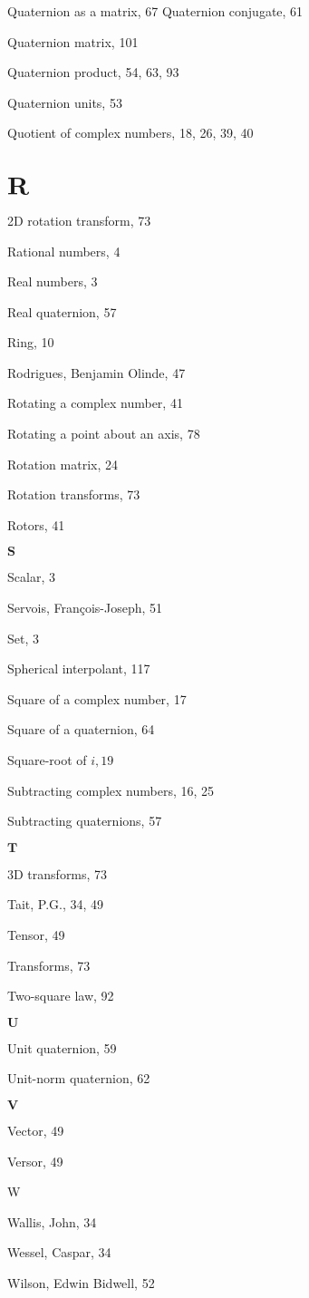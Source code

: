 Quaternion as a matrix, 67 Quaternion conjugate, 61

Quaternion matrix, 101

Quaternion product, 54, 63, 93

Quaternion units, 53

Quotient of complex numbers, 18, 26, 39, 40

\section{$\mathbf{R}$}
2D rotation transform, 73

Rational numbers, 4

Real numbers, 3

Real quaternion, 57

Ring, 10

Rodrigues, Benjamin Olinde, 47

Rotating a complex number, 41

Rotating a point about an axis, 78

Rotation matrix, 24

Rotation transforms, 73

Rotors, 41

$\mathbf{S}$

Scalar, 3

Servois, François-Joseph, 51

Set, 3

Spherical interpolant, 117

Square of a complex number, 17

Square of a quaternion, 64

Square-root of $i, 19$

Subtracting complex numbers, 16, 25

Subtracting quaternions, 57

$\mathbf{T}$

3D transforms, 73

Tait, P.G., 34, 49

Tensor, 49

Transforms, 73

Two-square law, 92

$\mathbf{U}$

Unit quaternion, 59

Unit-norm quaternion, 62

$\mathbf{V}$

Vector, 49

Versor, 49

W

Wallis, John, 34

Wessel, Caspar, 34

Wilson, Edwin Bidwell, 52

